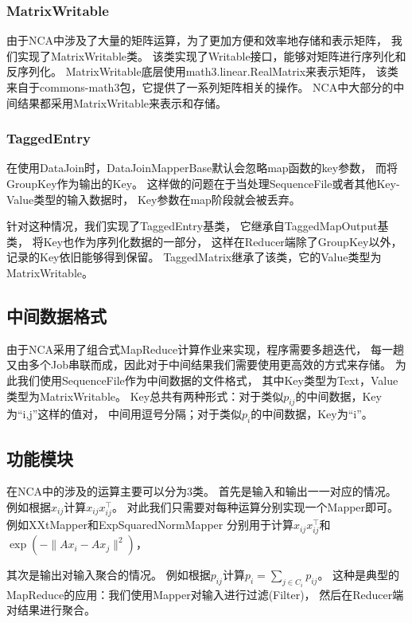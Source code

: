 \documentclass[a4paper,UTF8]{article}
\theoremstyle{definition}
\begin{document}
\subsubsection*{MatrixWritable}

由于NCA中涉及了大量的矩阵运算，为了更加方便和效率地存储和表示矩阵，
我们实现了MatrixWritable类。
该类实现了Writable接口，能够对矩阵进行序列化和反序列化。
MatrixWritable底层使用math3.linear.RealMatrix来表示矩阵，
该类来自于commons-math3包，它提供了一系列矩阵相关的操作。
NCA中大部分的中间结果都采用MatrixWritable来表示和存储。

\subsubsection*{TaggedEntry}

在使用DataJoin时，DataJoinMapperBase默认会忽略map函数的key参数，
而将GroupKey作为输出的Key。
这样做的问题在于当处理SequenceFile或者其他Key-Value类型的输入数据时，
Key参数在map阶段就会被丢弃。

针对这种情况，我们实现了TaggedEntry基类，
它继承自TaggedMapOutput基类，
将Key也作为序列化数据的一部分，
这样在Reducer端除了GroupKey以外，记录的Key依旧能够得到保留。
TaggedMatrix继承了该类，它的Value类型为MatrixWritable。

\subsection*{中间数据格式}

由于NCA采用了组合式MapReduce计算作业来实现，程序需要多趟迭代，
每一趟又由多个Job串联而成，因此对于中间结果我们需要使用更高效的方式来存储。
为此我们使用SequenceFile作为中间数据的文件格式，
其中Key类型为Text，Value类型为MatrixWritable。
Key总共有两种形式：对于类似$p_{ij}$的中间数据，Key为``i,j''这样的值对，
中间用逗号分隔；对于类似$p_{i}$的中间数据，Key为``i''。

\subsection*{功能模块}

在NCA中的涉及的运算主要可以分为3类。
首先是输入和输出一一对应的情况。例如根据$x_{ij}$计算$x_{ij} x_{ij}^\top$。
对此我们只需要对每种运算分别实现一个Mapper即可。
例如XXtMapper和ExpSquaredNormMapper
分别用于计算$x_{ij} x_{ij}^\top$和$\exp(-\lVert Ax_{i} - Ax_{j} \rVert^2)$，

其次是输出对输入聚合的情况。
例如根据$p_{ij}$计算$p_{i} = \sum_{j \in C_{i}} p_{ij}$。
这种是典型的MapReduce的应用：我们使用Mapper对输入进行过滤(Filter)，
然后在Reducer端对结果进行聚合。
\end{document}

